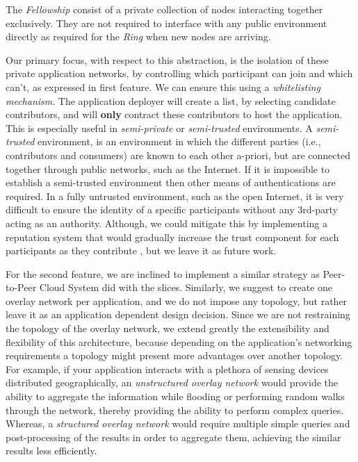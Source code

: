 \documentclass[12pt, titlepage]{uo_temp}
\begin{document}
     The \emph{Fellowship} consist of a private collection of nodes interacting together
     exclusively. They are not required to interface with any public environment directly
     as required for the \emph{Ring} when new nodes are arriving.

     Our primary focus, with respect to this abstraction, is the isolation of these
     private application networks, by controlling which participant can join and which
     can't, as expressed in first feature. We can ensure this using a \emph{whitelisting
       mechanism}. The application deployer will create a list, by selecting candidate
     contributors, and will \textbf{only} contract these contributors to host the
     application. This is especially useful in \emph{semi-private} or \emph{semi-trusted}
     environments. A \emph{semi-trusted} environment, is an environment in which the
     different parties (i.e., contributors and consumers) are known to each other
     a-priori, but are connected together through public networks, such as the
     Internet. If it is impossible to establish a semi-trusted environment then other
     means of authentications are required. In a fully untrusted environment, such as the
     open Internet, it is very difficult to ensure the identity of a specific participants
     without any 3rd-party acting as an authority. Although, we could mitigate this by
     implementing a reputation system that would gradually increase the trust component
     for each participants as they contribute \cite{jin2010unstructured}, but we leave it as
     future work.

     For the second feature, we are inclined to implement a similar strategy as
     Peer-to-Peer Cloud System did with the slices. Similarly, we suggest to create one
     overlay network per application, and we do not impose any topology, but rather leave
     it as an application dependent design decision. Since we are not restraining the
     topology of the overlay network, we extend greatly the extensibility and flexibility
     of this architecture, because depending on the application's networking requirements
     a topology might present more advantages over another topology. For example, if your
     application interacts with a plethora of sensing devices distributed geographically,
     an \emph{unstructured overlay network} would provide the ability to aggregate the
     information while flooding or performing random walks through the network, thereby
     providing the ability to perform complex queries. Whereas, a \emph{structured overlay
       network} would require multiple simple queries and post-processing of the results
     in order to aggregate them, achieving the similar results less efficiently.
\end{document}
